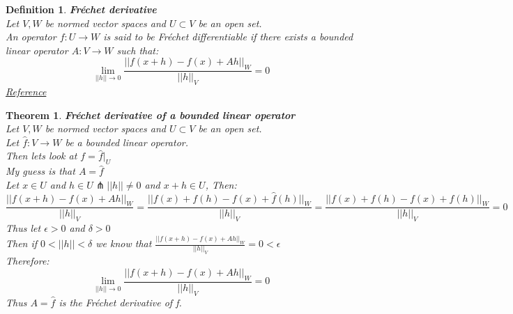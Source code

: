 \documentclass[12pt]{extarticle}
\theoremstyle{plain}
\newtheorem{thm}{Theorem}[section]
\theoremstyle{Definition}
\newtheorem{def.}{Definition}[section]
\theoremstyle{Definition}
\theoremstyle{plain}
\begin{document}
\newpage
\begin{def.} \textbf{Fréchet derivative} \\ 
		Let $V,W$ be normed vector spaces and $U \subset V$ be an open set. \\ 
		An operator $f : U \to W$ is said to be Fréchet differentiable if there exists a bounded linear operator $A : V \to W$ such that: \\ 
		$$\lim_{||h||\to0} \frac{||f(x+h) - f(x) + Ah||_W}{||h||_V} = 0$$
		\href{https://en.wikipedia.org/wiki/Fr%C3%A9chet_derivative}{Reference}
\end{def.} 
\begin{thm} \textbf{Fréchet derivative of a bounded linear operator} \\ 
	Let $V,W$ be normed vector spaces and $U \subset V$ be an open set. \\ 
	Let $\hat{f} : V \to W$ be a bounded linear operator. \\
	Then lets look at $f = \hat{f}|_{U}$ \\ 
	My guess is that $A = \hat{f}$ \\ 
	Let $x \in U$ and $h \in U \pitchfork ||h|| \not = 0$ and $x+h \in U$, Then: \\ 
	$$\frac{||f(x+h) - f(x) + Ah||_W}{||h||_V} = \frac{||f(x)+f(h) - f(x) + \hat{f}(h)||_W}{||h||_V} = \frac{||f(x)+f(h) - f(x) + f(h)||_W}{||h||_V}= 0$$
	Thus let $\epsilon > 0$ and $\delta > 0$ \\ 
	Then if $0 < ||h|| < \delta$ we know that  
	$\frac{||f(x+h) - f(x) + Ah||_W}{||h||_V} = 0 < \epsilon$ \\ 
	Therefore: 
	$$\lim_{||h||\to0} \frac{||f(x+h) - f(x) + Ah||_W}{||h||_V} = 0$$
	Thus $A = \hat{f}$ is the Fréchet derivative  of f. 
\end{thm}
\end{document}
